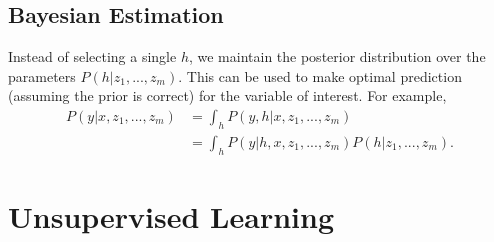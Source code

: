 \documentclass{article}
\begin{document}
    \subsection{Bayesian Estimation}
    Instead of selecting a single $h$, we maintain the posterior distribution over the parameters $P(h|z_1,...,z_m)$. This can be used to make optimal prediction (assuming the prior is correct) for the variable of interest. For example, 
    \begin{align}
    P(y|x,z_1,...,z_m) &= \int_h P(y,h|x,z_1,...,z_m) \\
    				   &= \int_h P(y|h,x,z_1,...,z_m) P(h|z_1,...,z_m).
    \end{align}
    
    
    \section{Unsupervised Learning}
    
\end{document}
